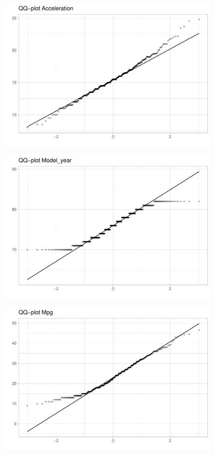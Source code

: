 \begin{figure}[H]\includegraphics[width=.9\linewidth]{img/EDA_files/figure-latex/unnamed-chunk-14-4} \caption{}\end{figure}

\begin{figure}[H]\includegraphics[width=.9\linewidth]{img/EDA_files/figure-latex/unnamed-chunk-14-5} \caption{}\end{figure}

\begin{figure}[H]\includegraphics[width=.9\linewidth]{img/EDA_files/figure-latex/unnamed-chunk-14-6} \caption{}\end{figure}

